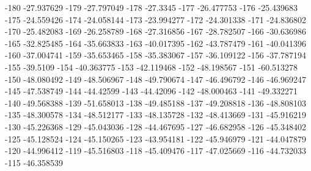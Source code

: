 -180                      -27.937629
-179                      -27.797049
-178                        -27.3345
-177                      -26.477753
-176                      -25.439683
-175                      -24.559426
-174                      -24.058144
-173                      -23.994277
-172                      -24.301338
-171                      -24.836802
-170                      -25.482083
-169                      -26.258789
-168                      -27.316856
-167                      -28.782507
-166                      -30.636986
-165                      -32.825485
-164                      -35.663833
-163                      -40.017395
-162                      -43.787479
-161                      -40.041396
-160                      -37.004741
-159                      -35.653465
-158                      -35.383067
-157                      -36.109122
-156                      -37.787194
-155                        -39.5109
-154                      -40.363775
-153                      -42.119468
-152                      -48.198567
-151                      -60.513278
-150                      -48.080492
-149                      -48.506967
-148                      -49.790674
-147                      -46.496792
-146                      -46.969247
-145                      -47.538749
-144                       -44.42599
-143                       -44.42096
-142                      -48.000463
-141                      -49.332271
-140                      -49.568388
-139                      -51.658013
-138                      -49.485188
-137                      -49.208818
-136                      -48.808103
-135                      -48.300578
-134                      -48.512177
-133                      -48.135728
-132                      -48.413669
-131                      -45.916219
-130                      -45.226368
-129                      -45.043036
-128                      -44.467695
-127                      -46.682958
-126                      -45.348402
-125                      -45.128524
-124                      -45.150265
-123                      -43.954181
-122                      -45.946979
-121                      -44.047879
-120                      -44.996412
-119                      -45.516803
-118                      -45.409476
-117                      -47.025669
-116                      -44.732033
-115                      -46.358539
